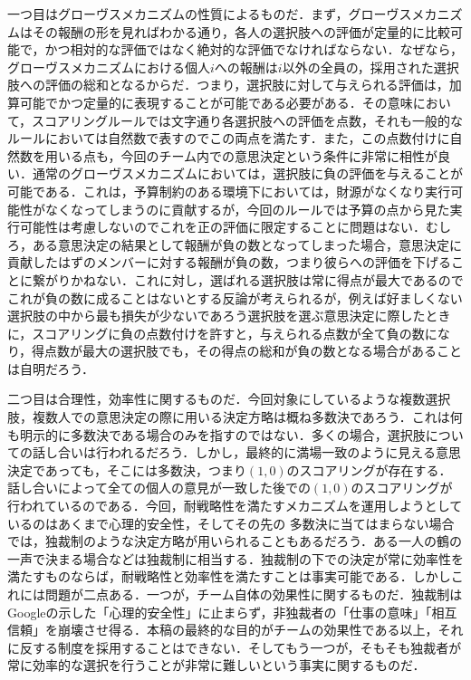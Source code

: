\documentclass[a4paper, 11pt]{jsarticle}
\begin{document}
一つ目はグローヴスメカニズムの性質によるものだ．まず，グローヴスメカニズムはその報酬の形を見ればわかる通り，各人の選択肢への評価が定量的に比較可能で，かつ相対的な評価ではなく絶対的な評価でなければならない．なぜなら，グローヴスメカニズムにおける個人\(i\)への報酬は\(i\)以外の全員の，採用された選択肢への評価の総和となるからだ．つまり，選択肢に対して与えられる評価は，加算可能でかつ定量的に表現することが可能である必要がある．その意味において，スコアリングルールでは文字通り各選択肢への評価を点数，それも一般的なルールにおいては自然数で表すのでこの両点を満たす．また，この点数付けに自然数を用いる点も，今回のチーム内での意思決定という条件に非常に相性が良い．通常のグローヴスメカニズムにおいては，選択肢に負の評価を与えることが可能である．これは，予算制約のある環境下においては，財源がなくなり実行可能性がなくなってしまうのに貢献するが，今回のルールでは予算の点から見た実行可能性は考慮しないのでこれを正の評価に限定することに問題はない．むしろ，ある意思決定の結果として報酬が負の数となってしまった場合，意思決定に貢献したはずのメンバーに対する報酬が負の数，つまり彼らへの評価を下げることに繋がりかねない．これに対し，選ばれる選択肢は常に得点が最大であるのでこれが負の数に成ることはないとする反論が考えられるが，例えば好ましくない選択肢の中から最も損失が少ないであろう選択肢を選ぶ意思決定に際したときに，スコアリングに負の点数付けを許すと，与えられる点数が全て負の数になり，得点数が最大の選択肢でも，その得点の総和が負の数となる場合があることは自明だろう．

二つ目は合理性，効率性に関するものだ．今回対象にしているような複数選択肢，複数人での意思決定の際に用いる決定方略は概ね多数決であろう．これは何も明示的に多数決である場合のみを指すのではない．多くの場合，選択肢についての話し合いは行われるだろう．しかし，最終的に満場一致のように見える意思決定であっても，そこには多数決，つまり\((1,0)\)のスコアリングが存在する．話し合いによって全ての個人の意見が一致した後での\((1,0)\)のスコアリングが行われているのである．今回，耐戦略性を満たすメカニズムを運用しようとしているのはあくまで心理的安全性，そしてその先の
多数決に当てはまらない場合では，独裁制のような決定方略が用いられることもあるだろう．ある一人の鶴の一声で決まる場合などは独裁制に相当する．独裁制の下での決定が常に効率性を満たすものならば，耐戦略性と効率性を満たすことは事実可能である．しかしこれには問題が二点ある．一つが，チーム自体の効果性に関するものだ．独裁制はGoogle\cite{Google}の示した「心理的安全性」に止まらず，非独裁者の「仕事の意味」「相互信頼」を崩壊させ得る．本稿の最終的な目的がチームの効果性である以上，それに反する制度を採用することはできない．そしてもう一つが，そもそも独裁者が常に効率的な選択を行うことが非常に難しいという事実に関するものだ．
\end{document}
